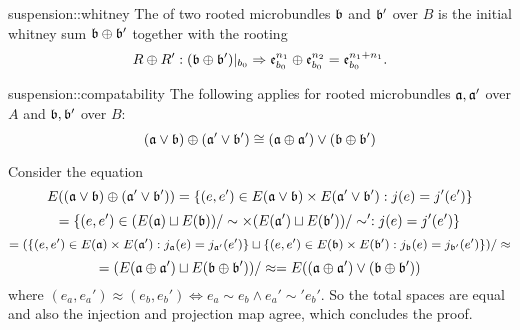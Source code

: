 \begin{mydefinition}{suspension::whitney}
    The  of two rooted microbundles $\bb$ and $\bb'$ over $B$
    is the initial whitney sum $\bb \oplus \bb'$ together with the rooting
    \[ R \oplus R': (\bb \oplus \bb')\restr{b_0} \double \be[n_1]_{b_0} \oplus \be[n_2]_{b_0} = \be[n_1 + n_1]_{b_0}. \]
\end{mydefinition}

\begin{mylemma}{suspension::compatability}   
    The following applies for rooted microbundles $\ba, \ba'$ over $A$ and $\bb, \bb'$ over $B$: 
    \[ (\ba \vee \bb) \oplus (\ba' \vee \bb') \cong (\ba \oplus \ba') \vee (\bb \oplus \bb') \]
\end{mylemma}
\begin{myproof}
    Consider the equation
    \[ E((\ba \vee \bb) \oplus (\ba' \vee \bb')) = \set{(e, e') \in E(\ba \vee \bb) \times E(\ba' \vee \bb')}{j(e) = j'(e')} \]
    \[ = \set{(e, e') \in (E(\ba) \sqcup E(\bb)) / \sim \times (E(\ba') \sqcup E(\bb')) / \sim'}{j(e) = j'(e')} \]
    \[ = (\set{(e, e') \in E(\ba) \times E(\ba')}{j_\ba(e) = j_{\ba'}(e')} \sqcup \set{(e, e') \in E(\bb) \times E(\bb')}{j_\bb(e) = j_{\bb'}(e')}) / \approx \]
    \[ = (E(\ba \oplus \ba') \sqcup E(\bb \oplus \bb')) / \approx = E((\ba \oplus \ba') \vee (\bb \oplus \bb'))\]
    where $(e_a, e_a') \approx (e_b, e_b') \iff e_a \sim e_b \land e_a' \sim' e_b'$.
    So the total spaces are equal and also the injection and projection map agree, which concludes the proof.
\end{myproof}